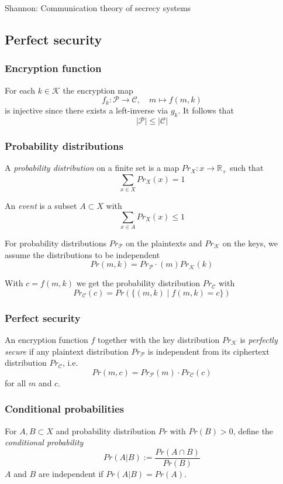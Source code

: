 \documentclass[a4paper]{scrartcl}
\newcommand\R{\mathbb R}
\newcommand\cP{\mathcal P}
\newcommand\cC{\mathcal C}
\newcommand\cK{\mathcal K}
\newcommand\Prob{\mathit{Pr}}
\begin{document}
Shannon: Communication theory of secrecy systems

\subsection{Perfect security}

\subsubsection{Encryption function}

For each $k\in\cK$ the encryption map
\[f_k:\cP\rightarrow\cC,\quad m\mapsto f(m,k)\]
is injective since there exists a left-inverse via $g_k$. It follows that
\[|\cP|\leq|\cC|\]

\subsubsection{Probability distributions}

A \textit{probability distribution} on a finite set is a map $\Prob_X:x\rightarrow \R_+$
such that \[\sum_{x\in X}\Prob_X(x)=1\]

An \textit{event} is a subset $A\subset X$ with
\[\sum_{x\in A}\Prob_X(x)\leq1\]

For probability distributions $\Prob_\cP$ on the plaintexts and $\Prob_\cK$ on the
keys, we assume the distributions to be independent
\[\Prob(m,k) = \Prob_\cP\cdot(m)\Prob_\cK(k)\]

With $c=f(m,k)$ we get the probability distribution $\Prob_\cC$ with
\[\Prob_\cC(c)=\Prob(\{(m,k)\mid f(m,k)=c\})\]

\subsubsection{Perfect security}

An encryption function $f$ together with the key distribution $\Prob_\cK$ is
\textit{perfectly secure} if any plaintext distribution $\Prob_\cP$ is
independent from its ciphertext distribution $\Prob_\cC$, i.e.
\[\Prob(m,c)=\Prob_\cP(m)\cdot\Prob_\cC(c)\]
for all $m$ and $c$.

\subsubsection{Conditional probabilities}

For $A,B\subset X$ and probability distribution $\Prob$ with $\Prob(B)>0$, define
the \textit{conditional probability}\[\Prob(A|B) := \frac{\Prob(A\cap B)}{\Prob(B)}\]
$A$ and $B$ are independent if $\Prob(A|B)=\Prob(A)$.
\end{document}
